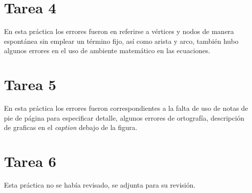 \documentclass[11pt,a4paper]{article}
\begin{document}
\newpage


\section*{Tarea 4}

En esta práctica los errores fueron en referirse a vértices y nodos de manera espontánea sin emplear un término fijo, así como arista y arco, también hubo algunos errores en el uso de ambiente matemático en las ecuaciones.

\newpage


\section*{Tarea 5}

En esta práctica los errores fueron correspondientes a la falta de uso de notas de pie de página para especificar detalle, algunos errores de ortografía, descripción de graficas en el \textit{caption} debajo de la figura.

\newpage


\section*{Tarea 6}

Esta práctica no se había revisado, se adjunta para su revisión.

\newpage

\end{document}
